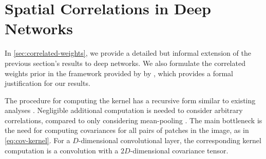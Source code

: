 \documentclass[tablecaption=bottom,wcp,nonatbib]{jmlr} %
\begin{document}




\section{Spatial Correlations in Deep Networks}
In \cref{sec:correlated-weights}, we provide a detailed but informal extension of the previous section's results to deep networks. We also formulate the correlated weights prior in the framework provided by by \citet{yang2019wide}, which provides a formal justification for our results.

The procedure for computing the kernel has a recursive form similar to existing analyses \citep{garriga2018infiniteconv,novak2019infiniteconv}. Negligible additional computation is needed to consider arbitrary correlations, compared to only considering mean-pooling \citep{novak2019infiniteconv,arora2019exact}. The main bottleneck is the need for computing covariances for all pairs of patches in the image, as in \cref{eq:cov-kernel}. For a $D$-dimensional convolutional layer, the corresponding kernel computation is a convolution with a $2D$-dimensional covariance tensor.
\end{document}
